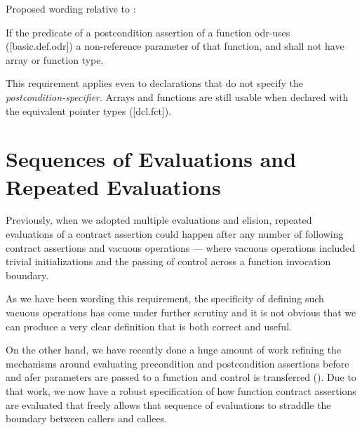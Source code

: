 Proposed wording relative to \cite{P2900R11}:

\begin{adjustwidth}{0.5cm}{0.5cm}
If the predicate of a postcondition assertion of a function odr-uses ([basic.def.odr]) a non-reference parameter of that function,  and shall not have array or function type.

\begin{note}
This requirement applies even to declarations that do not specify the \emph{postcondition-specifier}. Arrays and functions are still usable when declared with the equivalent pointer types ([dcl.fct]).
\end{note}
\end{adjustwidth}

\section{Sequences of Evaluations and Repeated Evaluations}

Previously, when we adopted multiple evaluations and elision,
repeated evaluations of a contract assertion could happen
after any number of following contract assertions
and vacuous operations --- where vacuous operations included
trivial initializations and the passing of control
across a function invocation boundary.

As we have been wording this requirement, the specificity
of defining such vacuous operations has come under further
scrutiny and it is not obvious that we can produce a very
clear definition that is both correct and useful.

On the other hand, we have recently done a huge amount of
work refining the mechanisms around evaluating precondition
and postcondition assertions before and afer parameters
are passed to a function and control is transferred (\cite{P3487R0}).
Due to that work, we now have a robust specification of how
function contract assertions are evaluated that freely
allows that sequence of evaluations to straddle the boundary
between callers and callees.

